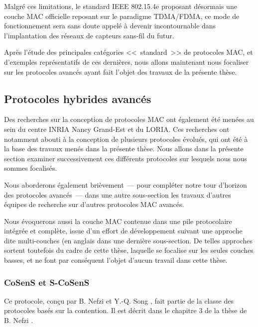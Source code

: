 Malgré ces limitations, le standard IEEE 802.15.4e proposant désormais une
couche MAC officielle reposant sur le paradigme TDMA/FDMA, ce mode de
fonctionnement sera sans doute appelé à devenir incontournable dans
l'implantation des réseaux de capteurs sans-fil du futur.

\bigskip

Après l'étude des principales catégories <<~standard~>> de protocoles MAC,
et d'exemples représentatifs de ces dernières, nous allons maintenant nous
focaliser sur les protocoles avancés ayant fait l'objet des travaux de
la présente thèse.


\subsection{Protocoles hybrides avancés}
\label{SubsecProtoMACavances}

Des recherches sur la conception de protocoles MAC ont également été menées
au sein du centre INRIA Nancy Grand-Est et du LORIA. Ces recherches ont
notamment abouti à la conception de plusieurs protocoles évolués, qui ont
été à la base des travaux menés dans la présente thèse. Nous allons dans
la présente section examiner successivement ces différents protocoles
sur lesquels nous nous sommes focalisés.

Nous aborderons également brièvement~--- pour compléter notre tour d'horizon
des protocoles avancés~--- dans une autre sous-section les travaux d'autres
équipes de recherche sur d'autres protocoles MAC avancés.

Nous évoquerons aussi la couche MAC contenue dans une pile protocolaire
intégrée et complète, issue d'un effort de développement suivant une approche
dite multi-couches (en anglais  dans une dernière
sous-section. De telles approches sortent toutefois du cadre de cette thèse,
laquelle se focalise sur les seules couches basses, et ne font par conséquent
l'objet d'aucun travail dans cette thèse.

\subsubsection{CoSenS et S-CoSenS}
\label{ParSCoSenS}

Ce protocole, conçu par B. Nefzi et Y.-Q. Song \cite{CosensConf}
\cite{CosensJournal}, fait partie de la classe des protocoles basés sur
la contention. Il est décrit dans le chapitre 3 de la thèse
de B. Nefzi \cite{TheseBNefzi}.

